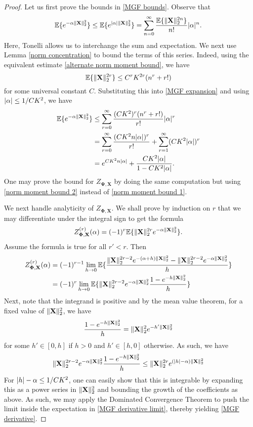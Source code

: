 \documentclass[final,12pt]{colt2018} %
\numberwithin{equation}{section}
\DeclarePairedDelimiter{\abs}{\lvert}{\rvert}
\DeclarePairedDelimiter{\norm}{\lVert}{\rVert}
\DeclarePairedDelimiter{\paren}{(}{)}
\DeclarePairedDelimiter{\braces}{\lbrace}{\rbrace}
\newcommand{\E}{\mathbb{E}}
\newcommand{\boldPhi}{\boldsymbol{\Phi}}
\newcommand{\boldPsi}{\boldsymbol{\Psi}}
\newcommand{\boldX}{\textbf{X}}
\begin{document}
\begin{proof}
	Let us first prove the bounds in \eqref{MGF bounds}. Observe that
	\begin{align} \label{MGF expansion}
	\E\braces{e^{-\alpha\norm{\boldX}_2^2}} \leq \E\braces{e^{\abs{\alpha}\norm{\boldX}_2^2}} = \sum_{n=0}^\infty \frac{\E\braces{\norm{\boldX}_2^{2n}}}{n!}\abs{\alpha}^n.
	\end{align}
	Here, Tonelli allows us to interchange the sum and expectation. We next use Lemma \ref{norm concentration} to bound the terms of this series. Indeed, using the equivalent estimate \eqref{alternate norm moment bound}, we have
	\[
	\E\braces{\norm{\boldX}_2^{2r}} \leq C^rK^{2r}\paren{n^r+r!}
	\]
	for some universal constant $C$. Substituting this into \eqref{MGF expansion} and using $\abs{\alpha} \leq 1/CK^2$, we have
	\begin{align*}
	\E\braces{e^{-\alpha\norm{\boldX}_2^2}} & \leq \sum_{r=0}^\infty \frac{(CK^2)^r(n^r+r!)}{r!}\abs{\alpha}^r \\
	& = \sum_{r=0}^\infty \frac{\paren{CK^2n\abs{\alpha}}^r}{r!} + \sum_{r=1}^\infty \paren{CK^2\abs{\alpha}}^r \\
	& = e^{CK^2n\abs{\alpha}} + \frac{CK^2\abs{\alpha}}{1-CK^2\abs{\alpha}}.
	\end{align*}
	One may prove the bound for $Z_{\boldPsi,\boldX}$ by doing the same computation but using \eqref{norm moment bound 2} instead of \eqref{norm moment bound 1}.
	
	We next handle analyticity of $Z_{\boldPhi,\boldX}$. We shall prove by induction on $r$ that we may differentiate under the integral sign to get the formula
	\begin{align} \label{MGF derivative}
	Z_{\boldPhi,\boldX}^{(r)}(\alpha) = (-1)^r\E\braces{\norm{\boldX}_2^{2r}e^{-\alpha\norm{\boldX}_2^2}}.
	\end{align}
	Assume the formula is true for all $r' < r$. Then
	\begin{align} \label{MGF derivative limit}
	Z_{\boldPhi,\boldX}^{(r)}(\alpha) & = (-1)^{r-1}\lim_{h \to 0}\E\braces{\frac{\norm{\boldX}_2^{2r-2}e^{-(\alpha+h)\norm{\boldX}_2^2}-\norm{\boldX}_2^{2r-2}e^{-\alpha\norm{\boldX}_2^2}}{h}} \\
	& = (-1)^r\lim_{h \to 0}\E\braces{\norm{\boldX}_2^{2r-2}e^{-\alpha\norm{\boldX}_2^2}\frac{1-e^{-h\norm{\boldX}_2^2}}{h}}
	\end{align}
	Next, note that the integrand is positive and by the mean value theorem, for a fixed value of $\norm{\boldX}_2^2$, we have
	\[
	\frac{1-e^{-h\norm{\boldX}_2^2}}{h} = \norm{\boldX}_2^2e^{-h'\norm{\boldX}_2^2}
	\]
	for some $h' \in [0,h]$ if $h > 0$ and $h' \in [h,0]$ otherwise. As such, we have
	\[
	\norm{\boldX}_2^{2r-2}e^{-\alpha\norm{\boldX}_2^2}\frac{1-e^{-h\norm{\boldX}_2^2}}{h} \leq \norm{\boldX}_2^{2r}e^{(\abs{h}-\alpha)\norm{\boldX}_2^2}
	\]
	For $\abs{h}-\alpha \leq 1/CK^2$, one can easily show that this is integrable by expanding this as a power series in $\norm{\boldX}_2^2$ and bounding the growth of the coefficients as above. As such, we may apply the Dominated Convergence Theorem to push the limit inside the expectation in \eqref{MGF derivative limit}, thereby yielding \eqref{MGF derivative}.
	

\end{proof}
\end{document}
